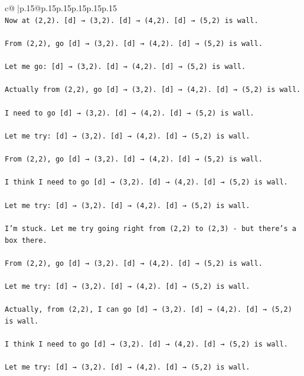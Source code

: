 \documentclass{article}
\begin{document}
{\begin{supertabular}{c@{$\;$}|p{.15\linewidth}@{}p{.15\linewidth}p{.15\linewidth}p{.15\linewidth}p{.15\linewidth}p{.15\linewidth}}
{{{\\ 
\texttt{Now at (2,2). {[}d{]} → (3,2). {[}d{]} → (4,2). {[}d{]} → (5,2) is wall.} \\
\\ 
\texttt{From (2,2), go {[}d{]} → (3,2). {[}d{]} → (4,2). {[}d{]} → (5,2) is wall.} \\
\\ 
\texttt{Let me go: {[}d{]} → (3,2). {[}d{]} → (4,2). {[}d{]} → (5,2) is wall.} \\
\\ 
\texttt{Actually from (2,2), go {[}d{]} → (3,2). {[}d{]} → (4,2). {[}d{]} → (5,2) is wall.} \\
\\ 
\texttt{I need to go {[}d{]} → (3,2). {[}d{]} → (4,2). {[}d{]} → (5,2) is wall.} \\
\\ 
\texttt{Let me try: {[}d{]} → (3,2). {[}d{]} → (4,2). {[}d{]} → (5,2) is wall.} \\
\\ 
\texttt{From (2,2), go {[}d{]} → (3,2). {[}d{]} → (4,2). {[}d{]} → (5,2) is wall.} \\
\\ 
\texttt{I think I need to go {[}d{]} → (3,2). {[}d{]} → (4,2). {[}d{]} → (5,2) is wall.} \\
\\ 
\texttt{Let me try: {[}d{]} → (3,2). {[}d{]} → (4,2). {[}d{]} → (5,2) is wall.} \\
\\ 
\texttt{I'm stuck. Let me try going right from (2,2) to (2,3) {-} but there's a box there.} \\
\\ 
\texttt{From (2,2), go {[}d{]} → (3,2). {[}d{]} → (4,2). {[}d{]} → (5,2) is wall.} \\
\\ 
\texttt{Let me try: {[}d{]} → (3,2). {[}d{]} → (4,2). {[}d{]} → (5,2) is wall.} \\
\\ 
\texttt{Actually, from (2,2), I can go {[}d{]} → (3,2). {[}d{]} → (4,2). {[}d{]} → (5,2) is wall.} \\
\\ 
\texttt{I think I need to go {[}d{]} → (3,2). {[}d{]} → (4,2). {[}d{]} → (5,2) is wall.} \\
\\ 
\texttt{Let me try: {[}d{]} → (3,2). {[}d{]} → (4,2). {[}d{]} → (5,2) is wall.} \\
\\ 
}}}
\end{supertabular}}
\end{document}
